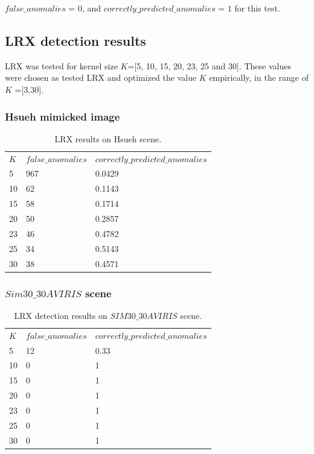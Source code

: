  $false\_anomalies$ = 0, and  $correctly\_predicted\_anomalies$ = $1$ for this test.

\subsection{LRX detection results}
LRX was tested for kernel size $K$=[5, 10, 15, 20, 23, 25 and 30]. These values were chosen as  \cite{global_and_local_rx} tested LRX and optimized the value $K$ empirically, in the range of $K$ =[3,30]. 

\subsubsection{Hsueh mimicked image}

 \begin{table}[H]
\centering
 \resizebox{0.9\textwidth}{!}
{\begin{tabular}{l|l|l}
\textbf{$K$} & $false\_anomalies$ & $correctly\_predicted\_anomalies$\\
5 & 967 &0.0429 \\
10 & 62&0.1143 \\
15 & 58&0.1714 \\
20 & 50& 0.2857\\
23 &46 &0.4782 \\
25 &34 & 0.5143\\
30 & 38& 0.4571\\

\end{tabular}}
\caption{LRX results on Hsueh scene.}
\label{tab:LRX_Hsueh}
\end{table}



\subsubsection{$Sim30\_30 AVIRIS$ scene}
 \begin{table}[H]
\centering
 \resizebox{0.9\textwidth}{!}
{\begin{tabular}{l|l|l}
\textbf{$K$} & $false\_anomalies$ & $correctly\_predicted\_anomalies$\\
5 &12 &0.33 \\
10 &0 &1 \\
15 & 0&1 \\
20 & 0&1 \\
23 &0 &1 \\
25 &0 &1 \\
30 & 0&1 \\

\end{tabular}}
\caption{LRX detection results on $SIM30\_30AVIRIS$ scene.}
\label{tab:LRX}

\end{table}

